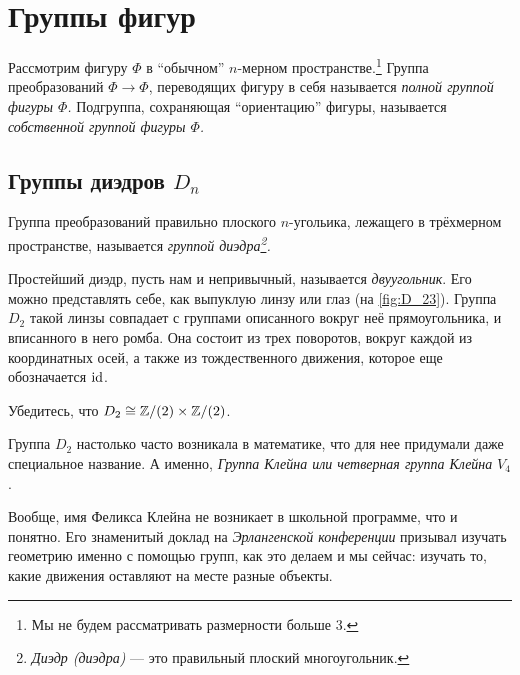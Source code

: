 \section{Группы фигур}
Рассмотрим фигуру $\Phi$ в ``обычном'' $n$-мерном пространстве.\footnote{Мы не будем рассматривать размерности больше 3.} Группа преобразований $\Phi \to \Phi$, переводящих фигуру в себя называется \emph{полной группой фигуры $\Phi$.} Подгруппа, сохраняющая ``ориентацию'' фигуры, называется \emph{собственной группой фигуры $\Phi$.}

\subsection{Группы диэдров $D_n$}
\begin{definition}
    Группа преобразований правильно плоского $n$-угольика, лежащего в трёхмерном пространстве, называется \emph{группой диэдра\footnote{\emph{Диэдр (диэдра)} --- это правильный плоский многоугольник.
}.} 
    \end{definition}
Простейший диэдр, пусть нам и непривычный, называется \emph{двуугольник}. Его можно представлять себе, как выпуклую линзу или глаз (на \cref{fig:D_23}). Группа $D_2$ такой линзы совпадает с группами описанного вокруг неё прямоугольника, и вписанного в него ромба. Она состоит из трех поворотов, вокруг каждой из координатных осей, а также из тождественного движения, которое еще обозначается $\operatorname{id}$.

\begin{practice}
    Убедитесь, что $D_2 \cong \mathbb Z/(2) \times \mathbb Z/(2)$.
\end{practice}

Группа $D_2$ настолько часто возникала в математике, что для нее придумали даже специальное название. А именно, \emph{Группа Клейна или четверная группа Клейна} $V_4$.

Вообще, имя Феликса Клейна не возникает в школьной программе, что и понятно. Его знаменитый доклад на \emph{Эрлангенской конференции} призывал изучать геометрию именно с помощью групп, как это делаем и мы сейчас: изучать то, какие движения оставляют на месте разные объекты.

